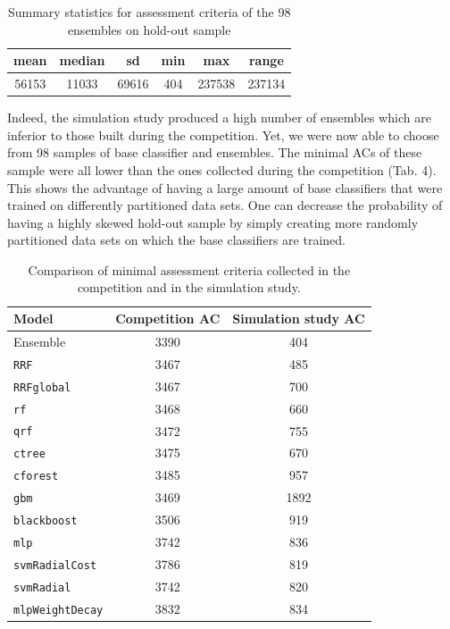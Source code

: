 \begin{table}
\centering
\begin{tabular}{|c|c|c|c|c|c|}
\hline
\hline
mean & median & sd & min & max & range\\
\hline
56153 & 11033 & 69616 & 404 & 237538 & 237134\\
\hline
\hline
\end{tabular}
\caption{Summary statistics for assessment criteria of the 98 ensembles on hold-out sample}
\end{table}

Indeed, the simulation study produced a high number of ensembles which are inferior to those built during the competition. Yet, we were now able to choose from 98 samples of base classifier and ensembles. The minimal ACs of these sample were all lower than the ones collected during the competition (Tab. 4). This shows the advantage of having a large amount of base classifiers that were trained on differently partitioned data sets. One can decrease the probability of having a highly skewed hold-out sample by simply creating more randomly partitioned data sets on which the base classifiers are trained.

\begin{table}
\centering
\begin{tabular}{l|cc}
\hline
\hline
Model & Competition AC & Simulation study AC\\
\hline
Ensemble 			& 3390 		& 404\\
\texttt{RRF} 		& 3467 		& 485\\
\texttt{RRFglobal} 	& 3467 		& 700\\
\texttt{rf} 		& 3468 		& 660\\
\texttt{qrf} 		& 3472 		& 755\\
\texttt{ctree} 		& 3475 		& 670\\
\texttt{cforest} 	& 3485 		& 957\\
\texttt{gbm }		& 3469 		& 1892\\
\texttt{blackboost} & 3506 		& 919\\
\texttt{mlp} 		& 3742 		& 836\\
\texttt{svmRadialCost} & 3786 	& 819\\
\texttt{svmRadial} 	& 3742 		& 820\\
\texttt{mlpWeightDecay} & 3832 	& 834\\
\hline
\hline
\end{tabular}
\caption{Comparison of minimal assessment criteria collected in the competition and in the simulation study.}
\end{table}

